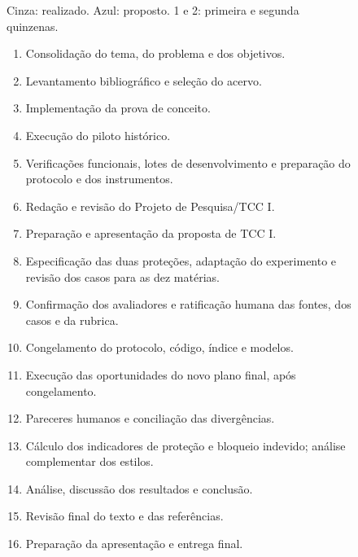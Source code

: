 \begin{figure}[p]
\par\smallskip
{\footnotesize Cinza: realizado. Azul: proposto. 1 e 2: primeira e segunda quinzenas.\par}
\medskip
\begin{minipage}{\textwidth}
\small\SingleSpacing
\begin{enumerate}[label=\arabic*),nosep,leftmargin=0.8cm]
\item Consolidação do tema, do problema e dos objetivos.
\item Levantamento bibliográfico e seleção do acervo.
\item Implementação da prova de conceito.
\item Execução do piloto histórico.
\item Verificações funcionais, lotes de desenvolvimento e preparação do protocolo e dos instrumentos.
\item Redação e revisão do Projeto de Pesquisa/TCC I.
\item Preparação e apresentação da proposta de TCC I.
\item Especificação das duas proteções, adaptação do experimento e revisão dos casos para as dez matérias.
\item Confirmação dos avaliadores e ratificação humana das fontes, dos casos e da rubrica.
\item Congelamento do protocolo, código, índice e modelos.
\item Execução das oportunidades do novo plano final, após congelamento.
\item Pareceres humanos e conciliação das divergências.
\item Cálculo dos indicadores de proteção e bloqueio indevido; análise complementar dos estilos.
\item Análise, discussão dos resultados e conclusão.
\item Revisão final do texto e das referências.
\item Preparação da apresentação e entrega final.
\end{enumerate}
\end{minipage}
\end{figure}
